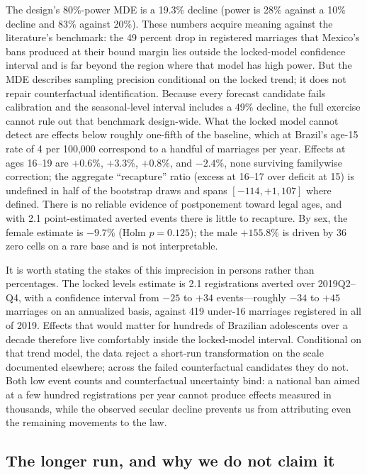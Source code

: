 \documentclass[12pt]{article}
\begin{document}
The design's 80\%-power MDE is a 19.3\% decline (power is 28\% against a 10\% decline
and 83\% against 20\%). These numbers acquire meaning against the literature's
benchmark: the 49 percent drop in registered marriages that Mexico's bans produced at
their bound margin \citep{BellesObreroLombardi2023} lies outside the locked-model
confidence interval and is far beyond the region where that model has high power. But
the MDE describes sampling precision conditional on the locked trend; it does not repair
counterfactual identification. Because every forecast candidate fails calibration and
the seasonal-level interval includes a 49\% decline, the full exercise cannot rule out
that benchmark design-wide. What the locked model cannot detect are effects below
roughly one-fifth of the baseline, which at Brazil's age-15 rate of 4 per 100,000
correspond to a handful of marriages per year. Effects at ages 16--19 are $+0.6\%$,
$+3.3\%$, $+0.8\%$, and
$-2.4\%$, none surviving familywise correction; the aggregate ``recapture'' ratio
(excess at 16--17 over deficit at 15) is undefined in half of the bootstrap draws and
spans $[-114, +1{,}107]$ where defined. There is no reliable evidence of postponement
toward legal ages, and with 2.1 point-estimated averted events there is little to
recapture. By sex, the female estimate is $-9.7\%$ (Holm $p=0.125$); the male
$+155.8\%$ is driven by 36 zero cells on a rare base and is not interpretable.

It is worth stating the stakes of this imprecision in persons rather than percentages.
The locked levels estimate is 2.1 registrations averted over 2019Q2--Q4, with a
confidence interval from $-25$ to $+34$ events---roughly $-34$ to $+45$ marriages on
an annualized basis, against 419 under-16 marriages registered in all of 2019. Effects
that would matter for hundreds of Brazilian adolescents over a decade therefore live
comfortably inside the locked-model interval. Conditional on that trend model, the data
reject a short-run transformation on the scale documented elsewhere; across the failed
counterfactual candidates they do not. Both low event counts and counterfactual
uncertainty bind: a national ban aimed at a few hundred registrations per year cannot
produce effects measured in thousands, while the observed secular decline prevents us
from attributing even the remaining movements to the law.

\subsection{The longer run, and why we do not claim it}
\end{document}
